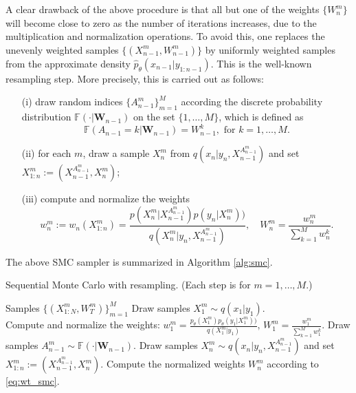 \documentclass[12pt]{article}
\def\phat{\widehat{p}}
\begin{document}
A clear drawback of the above procedure is that all but one of the weights $\{W_n^m\}$ will become close to zero as the number of iterations increases, due to the multiplication and normalization operations. To avoid this, one replaces the unevenly weighted samples  $\{(X_{n-1}^m, W_{n-1}^m)\}$ by uniformly weighted samples from the approximate density $\phat_\theta(x_{n-1} | y_{1:n-1} )$. This is the well-known resampling step. More precisely, this is carried out as follows:
\begin{itemize}
\item [(i)] draw random indices $\{A_{n-1}^m\}_{m=1}^M$ according the discrete probability distribution $\mathbb{F}(\cdot|\mathbf{W}_{n-1})$ on the set  $\{1,\dots,M\}$, which is defined as
 \[
 \mathbb{F}(A_{n-1}=k | {\mathbf{W}_{n-1}}) = W_{n-1}^k, \text{ for } k=1,\dots, M.
 \]
\item [(ii)] for each $m$, draw a sample $X_n^m$ from $q(x_n | y_n, X_{n-1}^{A_{n-1}^m})$ and set $X_{1:n}^{m} := (X_{n-1}^{A_{n-1}^m}, X_n^m)$;
\item [(iii)] compute and normalize the weights
\begin{equation}\label{eq:wt_smc}
w_n^m:=w_n(X_{1:n}^m)= \frac{p(X_n^m|X_{n-1}^{A_{n-1}^m} )p(y_n|X_n^m))}{q(X_n^m|y_n, X_{n-1}^{A_{n-1}^m} )},\quad W_{n}^m= \frac{w_n^m}{\sum_{k=1}^Mw_{n}^k}.
\end{equation}
 \end{itemize}
 
 The above SMC sampler is summarized in Algorithm \ref{alg:smc}. 
 \begin{algorithm} %
\caption{Sequential Monte Carlo with resampling. (Each step is for $m=1,\dots, M$.)  } %
\label{alg:smc} %
\begin{algorithmic}%
    \ENSURE Samples $\{(X_{1:N}^m, W_{T}^m)\}_{m=1}^M$ 
    \STATE  Draw samples $X_{1}^m\sim q(x_{1}|y_1)$. \\
    \STATE Compute and normalize the weights: %
     $w_{1}^m =\frac{p_\theta(X^m_1)p_\theta(y_1|X_1^m))}{q(X_1^m|y_1)},\, W_{1}^m= \frac{w_1^m}{\sum_{k=1}^Mw_{1}^k}$.  
            \STATE  Draw samples $A_{n-1}^m\sim \mathbb{F}(\cdot | \mathbf{W}_{n-1})$. 
            \STATE  Draw samples $X_{n}^m\sim  q(x_n|y_n, X_{n-1}^{A_{n-1}^m} )$ and set $X_{1:n}^{m} := (X_{n-1}^{A_{n-1}^m}, X_n^m)$.
            \STATE Compute the normalized weights $W_n^m$ according to \eqref{eq:wt_smc}. 
    \ENDFOR
\end{algorithmic}
\end{algorithm}
\end{document}
